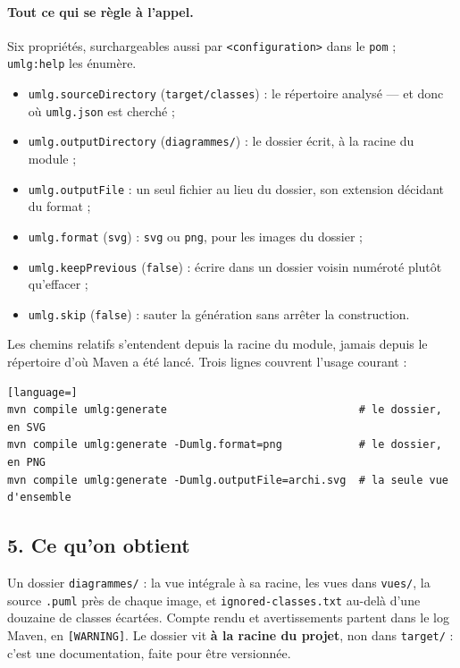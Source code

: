 \documentclass[12pt, a4paper]{article}
\begin{document}
\paragraph{Tout ce qui se règle à l'appel.} Six propriétés, surchargeables aussi par \texttt{<configuration>} dans le \texttt{pom} ; \texttt{umlg:help} les énumère.

\begin{itemize}
    \item \texttt{umlg.sourceDirectory} (\texttt{target/classes}) : le répertoire analysé --- et donc où \texttt{umlg.json} est cherché ;
    \item \texttt{umlg.outputDirectory} (\texttt{diagrammes/}) : le dossier écrit, à la racine du module ;
    \item \texttt{umlg.outputFile} : un seul fichier au lieu du dossier, son extension décidant du format ;
    \item \texttt{umlg.format} (\texttt{svg}) : \texttt{svg} ou \texttt{png}, pour les images du dossier ;
    \item \texttt{umlg.keepPrevious} (\texttt{false}) : écrire dans un dossier voisin numéroté plutôt qu'effacer ;
    \item \texttt{umlg.skip} (\texttt{false}) : sauter la génération sans arrêter la construction.
\end{itemize}

\noindent Les chemins relatifs s'entendent depuis la racine du module, jamais depuis le répertoire d'où Maven a été lancé. Trois lignes couvrent l'usage courant :

\begin{lstlisting}[language=]
mvn compile umlg:generate                              # le dossier, en SVG
mvn compile umlg:generate -Dumlg.format=png            # le dossier, en PNG
mvn compile umlg:generate -Dumlg.outputFile=archi.svg  # la seule vue d'ensemble
\end{lstlisting}

\subsection{5. Ce qu'on obtient}
Un dossier \texttt{diagrammes/} : la vue intégrale à sa racine, les vues dans \texttt{vues/}, la source \texttt{.puml} près de chaque image, et \texttt{ignored-classes.txt} au-delà d'une douzaine de classes écartées. Compte rendu et avertissements partent dans le log Maven, en \texttt{[WARNING]}. Le dossier vit \textbf{à la racine du projet}, non dans \texttt{target/} : c'est une documentation, faite pour être versionnée.

\end{document}
